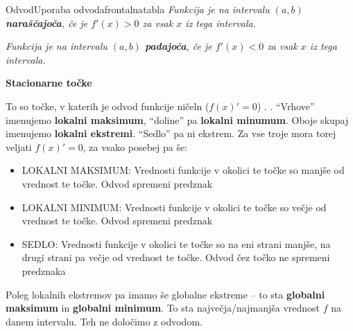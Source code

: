 \begin{priprava}{}{}{Odvod}{Uporaba odvoda}{frontalna}{tabla}
\emph{Funkcija je na intervalu $ (a, b) $ \textbf{naraščajoča}, če je $ f'(x) > 0 $ za vsak $ x $ iz tega intervala.}

\emph{Funkcija je na intervalu $ (a, b) $ \textbf{padajoča}, če je $ f'(x) < 0 $ za vsak $ x $ iz tega intervala.}


\textbf{Stacionarne točke}

To so točke, v katerih je odvod funkcije ničeln ($ f(x)' = 0 $) . . ``Vrhove'' imenujemo \textbf{lokalni maksimum}, ``doline'' pa \textbf{lokalni minumum}. Oboje skupaj imenujemo \textbf{lokalni ekstremi}. ``Sedlo'' pa ni ekstrem. Za vse troje mora torej veljati $ f(x)'= 0 $, za vsako posebej pa še:

\newpage

\begin{itemize}
    \item LOKALNI MAKSIMUM: Vrednosti funkcije v okolici te točke so manjše od vrednost te točke. Odvod spremeni predznak 
    \item LOKALNI MINIMUM: Vrednosti funkcije v okolici te točke so večje od vrednost te točke. Odvod spremeni predznak 
    \item SEDLO: Vrednosti funkcije v okolici te točke so na eni strani manjše, na drugi strani pa večje od vrednost te točke. Odvod čez točko ne spremeni predznaka 
\end{itemize}
    
Poleg lokalnih ekstremov pa imamo še globalne ekstreme -- to sta \textbf{globalni maksimum} in \textbf{globalni minimum}. To sta največja/najmanjša vrednost $ f $ na danem intervalu. Teh ne določimo z odvodom. 




\end{priprava}
